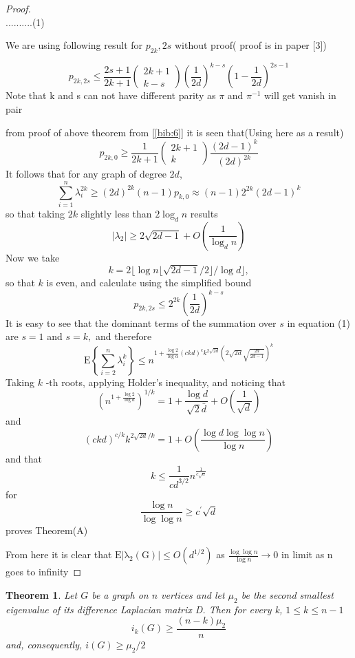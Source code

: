 \documentclass[oneside]{book}
\newtheorem{theorem}{Theorem}[section]
\begin{document}
\begin{proof}
$$		$$    ..........(1)\par
		We are using following result for $p_{2k},{2s}$ without proof( proof is in paper [3])  \par
		$$
		p_{2 k, 2 s} \leq \frac{2 s+1}{2 k+1}\left(\begin{array}{c}
		2 k+1 \\
		k-s
		\end{array}\right)\left(\frac{1}{2 d}\right)^{k-s}\left(1-\frac{1}{2 d}\right)^{2 s-1}
		$$
		Note that k and s can not have different parity as  $\pi$ and $\pi^{-1}$ will get vanish in pair\par
		from proof of above theorem from [\ref{bib:6}] it is seen that(Using here as a result)  
		$$ p_{2 k, 0} \geq \frac{1}{2 k+1}\left(\begin{array}{c}
		2 k+1 \\
		k
		\end{array}\right) \frac{(2 d-1)^{k}}{(2 d)^{2 k}}$$
		It follows that for any graph of degree $2 d$,
		$$
		\sum_{i=1}^{n} \lambda_{i}^{2 k} \geq(2 d)^{2 k}(n-1) p_{k, 0} \approx(n-1) 2^{2 k}(2 d-1)^{k}
		$$
		so that taking $2 k$ slightly less than $2 \log _{d} n$ results 
		$$
		\left|\lambda_{2}\right| \geq 2 \sqrt{2 d-1}+O\left(\frac{1}{\log _{d} n}\right)
		$$
		Now we take $$k=2\lfloor\log n\lfloor\sqrt{2 d-1} / 2\rfloor / \log d\rfloor,$$ so that $k$ is even, and calculate
		using the simplified bound
		$$
		p_{2 k, 2 s} \leq 2^{2 k}\left(\frac{1}{2 d}\right)^{k-s}
		$$
		It is easy to see that the dominant terms of the summation over $s$ in equation (1) are $s=1$ and $s=k,$ and therefore
		$$
		\mathrm{E}\left\{\sum_{i=2}^{n} \lambda_{i}^{k}\right\} \leq n^{1+\frac{\log 2}{\log \alpha}(c k d)^{c} k^{2 \sqrt{2 d}}(2 \sqrt{2 d} \sqrt{\frac{2 d}{2 d-1}})^{k}}
		$$
		Taking $k$ -th roots, applying Holder's  inequality, and noticing that
		$$
		\left(n^{1+\frac{\log 2}{\log d}}\right)^{1 / k}=1+\frac{\log d}{\sqrt{2} \bar{d}}+O\left(\frac{1}{\sqrt{d}}\right)
		$$
		and 
		$$
		(c k d)^{c / k} k^{2 \sqrt{2 d} / k}=1+O\left(\frac{\log d \log \log n}{\log n}\right)
		$$
		and that
		$$
		k \leq \frac{1}{c d^{3 / 2}} n^{\frac{1}{c \sqrt{a}}}
		$$
		for
		$$
		\frac{\log n}{\log \log n} \geq c^{\prime} \sqrt{d}
		$$
		proves Theorem(A)  \par 
		From here it is clear that $\mathrm{E|\lambda_{2}(G)|} \leq O(d^{1/2})$ as $\frac{ \log \log n}{\log n}\rightarrow 0$ in limit  as n goes to  infinity 
	\end{proof} 
	\begin{theorem} 
		\label{t:14}
		Let $G$ be a graph on $n$ vertices and let $\mu_{2}$ be the second smallest eigenvalue of its difference Laplacian matrix D. Then for every k, 
		$1 \leq k \leq n-1$
		$$
		i_{k}(G) \geq \frac{(n-k) \mu_{2}}{n}
		$$
		and, consequently, $i(G) \geq \mu_{2} / 2$ \par
	\end{theorem} 
\end{document}
